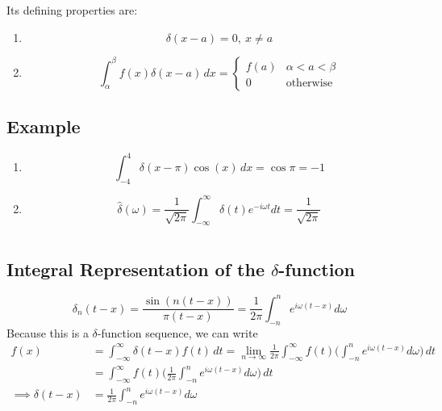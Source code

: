 \documentclass[a4paper, 11pt, normalem]{report}
\newcommand\ifnt{\int_{-\infty}^{\infty}}
\newcommand\om{\omega}
\begin{document}
Its defining properties are:
\begin{enumerate}
    \item   \begin{equation*}
                \delta(x - a) = 0,~ x \neq a
            \end{equation*}
    \item   \begin{equation*}
                \int_{\alpha}^{\beta} f(x)\delta(x - a)\,dx =
                \begin{cases}
                    f(a) & \alpha < a < \beta \\
                    0 & \text{otherwise}
                \end{cases}
            \end{equation*}
\end{enumerate}

\section{Example}
\begin{enumerate}
    \item   \begin{equation*}
                \int_{-4}^{4} \delta(x - \pi)\cos(x)\,dx = \cos\pi = -1
            \end{equation*}
    \item   \begin{equation*}
                \hat{\delta}(\om) = \frac{1}{\sqrt{2\pi}} \ifnt \delta(t)e^{-i\om t}dt = \frac{1}{\sqrt{2\pi}}
            \end{equation*}
\end{enumerate}

\chapter{}
\section{Integral Representation of the $\delta$-function}
\begin{equation*}
    \delta_n (t - x) = \frac{\sin(n(t - x))}{\pi(t - x)} = \frac{1}{2\pi} \int_{-n}^{n} e^{i\om(t - x)}d\om
\end{equation*}
Because this is a $\delta$-function sequence, we can write
\begin{align*}
    f(x) &= \ifnt \delta(t - x)f(t)\,dt = \lim_{n \to \infty} \frac{1}{2\pi} \ifnt f(t) \Bigg(\int_{-n}^{n} e^{i\om(t - x)}d\om\Bigg)\,dt \\
    &= \ifnt f(t)\Bigg(\frac{1}{2\pi} \int_{-n}^{n} e^{i\om(t - x)} d\om\Bigg)\,dt \\
    \implies \delta(t - x) &= \frac{1}{2\pi} \int_{-n}^{n} e^{i\om(t - x)} d\om
\end{align*}
\end{document}

